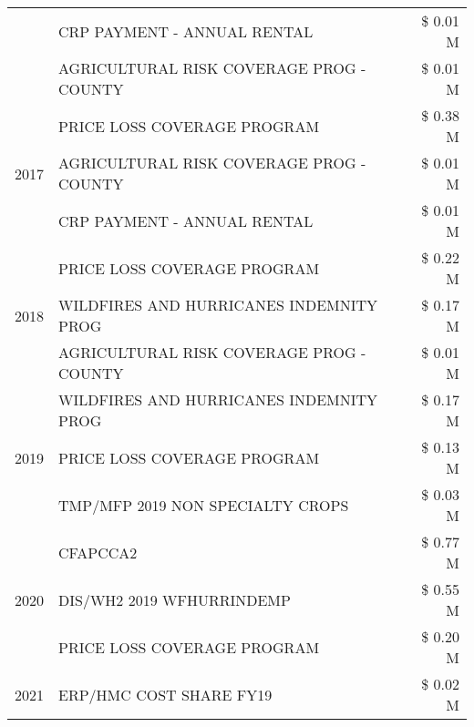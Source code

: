 \begin{tabular}{llr}
 & CRP PAYMENT - ANNUAL RENTAL                   & \$ 0.01 M \\
 & AGRICULTURAL RISK COVERAGE PROG - COUNTY      & \$ 0.01 M \\
\cline{1-3}
\multirow[t]{3}{*}{2017} & PRICE LOSS COVERAGE PROGRAM & \$ 0.38 M \\
 & AGRICULTURAL RISK COVERAGE PROG - COUNTY & \$ 0.01 M \\
 & CRP PAYMENT - ANNUAL RENTAL & \$ 0.01 M \\
\cline{1-3}
\multirow[t]{3}{*}{2018} & PRICE LOSS COVERAGE PROGRAM & \$ 0.22 M \\
 & WILDFIRES AND HURRICANES INDEMNITY PROG & \$ 0.17 M \\
 & AGRICULTURAL RISK COVERAGE PROG - COUNTY & \$ 0.01 M \\
\cline{1-3}
\multirow[t]{3}{*}{2019} & WILDFIRES AND HURRICANES INDEMNITY PROG & \$ 0.17 M \\
 & PRICE LOSS COVERAGE PROGRAM & \$ 0.13 M \\
 & TMP/MFP 2019 NON SPECIALTY CROPS & \$ 0.03 M \\
\cline{1-3}
\multirow[t]{3}{*}{2020} & CFAPCCA2 & \$ 0.77 M \\
 & DIS/WH2 2019 WFHURRINDEMP & \$ 0.55 M \\
 & PRICE LOSS COVERAGE PROGRAM & \$ 0.20 M \\
\cline{1-3}
2021 & ERP/HMC COST SHARE FY19 & \$ 0.02 M \\
\cline{1-3}
\bottomrule
\end{tabular}
